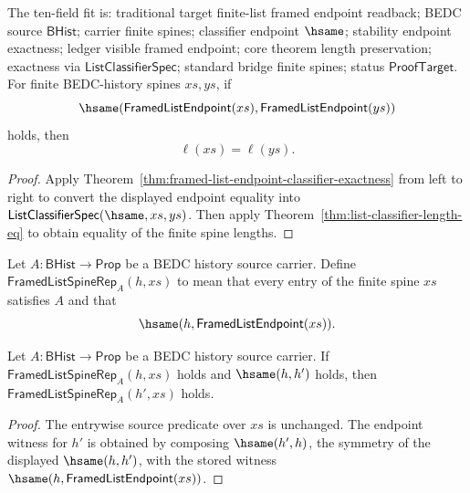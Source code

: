 \begin{theorem}
\label{thm:framed-list-endpoint-length-preservation}
The ten-field fit is: traditional target finite-list framed endpoint readback;
BEDC source $\mathsf{BHist}$; carrier finite spines; classifier endpoint
$\hsame$; stability endpoint exactness; ledger visible framed endpoint; core
theorem length preservation; exactness via $\mathsf{ListClassifierSpec}$;
standard bridge finite spines; status $\mathsf{ProofTarget}$. For finite
BEDC-history spines $xs,ys$, if
$$
\hsame(\mathsf{FramedListEndpoint}(xs),\mathsf{FramedListEndpoint}(ys))
$$
holds, then
$$
\ell(xs)=\ell(ys).
$$
\end{theorem}
\begin{proof}
Apply Theorem~\ref{thm:framed-list-endpoint-classifier-exactness} from left to
right to convert the displayed endpoint equality into
$\mathsf{ListClassifierSpec}(\hsame,xs,ys)$. Then apply
Theorem~\ref{thm:list-classifier-length-eq} to obtain equality of the finite
spine lengths.
\end{proof}

\begin{definition}
\label{def:framed-list-spine-representation}
Let $A:\mathsf{BHist}\to\mathsf{Prop}$ be a BEDC history source carrier. Define
$\mathsf{FramedListSpineRep}_A(h,xs)$ to mean that every entry of the finite
spine $xs$ satisfies $A$ and that
$$
\hsame(h,\mathsf{FramedListEndpoint}(xs)).
$$
\end{definition}

\begin{theorem}
\label{thm:framed-list-spine-rep-hsame-transport}
Let $A:\mathsf{BHist}\to\mathsf{Prop}$ be a BEDC history source carrier. If
$\mathsf{FramedListSpineRep}_A(h,xs)$ holds and $\hsame(h,h')$ holds, then
$\mathsf{FramedListSpineRep}_A(h',xs)$ holds.
\end{theorem}
\begin{proof}
The entrywise source predicate over $xs$ is unchanged. The endpoint witness for
$h'$ is obtained by composing $\hsame(h',h)$, the symmetry of the displayed
$\hsame(h,h')$, with the stored witness
$\hsame(h,\mathsf{FramedListEndpoint}(xs))$.
\end{proof}

